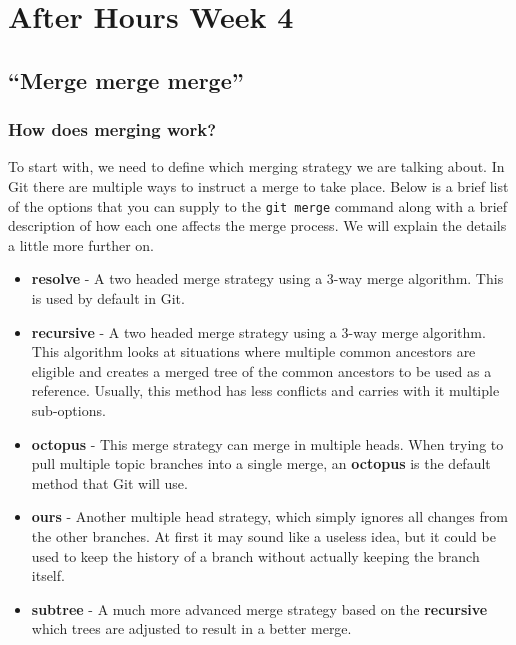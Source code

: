 \chapter{After Hours Week 4}
\section{``Merge merge merge''}
\subsection{How does merging work?}

To start with, we need to define which merging strategy we are talking about.  In Git there are multiple ways to instruct a merge to take place.  Below is a brief list of the options that you can supply to the \texttt{git merge} command along with a brief description of how each one affects the merge process.  We will explain the details a little more further on.

\begin{itemize}
\item\textbf{resolve} - A two headed merge strategy using a 3-way merge algorithm.  This is used by default in Git.
\item\textbf{recursive} - A two headed merge strategy using a 3-way merge algorithm.  This algorithm looks at situations where multiple common ancestors are eligible and creates a merged tree of the common ancestors to be used as a reference.  Usually, this method has less conflicts and carries with it multiple sub-options.
\item\textbf{octopus} - This merge strategy can merge in multiple heads.  When trying to pull multiple topic branches into a single merge, an \textbf{octopus} is the default method that Git will use.
\item\textbf{ours} - Another multiple head strategy, which simply ignores all changes from the other branches.  At first it may sound like a useless idea, but it could be used to keep the history of a branch without actually keeping the branch itself.
\item\textbf{subtree} - A much more advanced merge strategy based on the \textbf{recursive} which trees are adjusted to result in a better merge.
\end{itemize}

